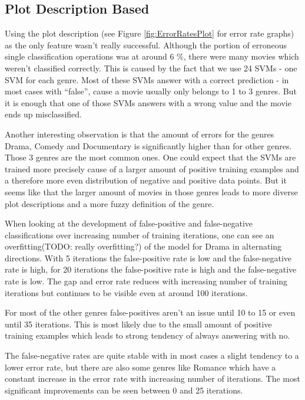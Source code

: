 \documentclass{vldb}
\begin{document}
\subsection{Plot Description Based}
\par Using the plot description (see Figure \ref{fig:ErrorRatesPlot} for error rate graphs) as the only feature wasn’t really successful. Although the portion of erroneous single classification operations was at around 6 \%, there were many movies which weren’t classified correctly. This is caused by the fact that we use 24 SVMs - one SVM for each genre. Most of these SVMs answer with a correct prediction - in most cases with “false”, cause a movie usually only belongs to 1 to 3 genres. But it is enough that one of those SVMs answers with a wrong value and the movie ends up misclassified.
\par Another interesting observation is that the amount of errors for the genres Drama, Comedy and Documentary is significantly higher than for other genres. Those 3 genres are the most common ones. One could expect that the SVMs are trained more precisely cause of a larger amount of positive training examples and a therefore more even distribution of negative and positive data points. But it seems like that the larger amount of movies in those genres leads to more diverse plot descriptions and a more fuzzy definition of the genre.
\par When looking at the development of false-positive and false-negative classifications over increasing number of training iterations, one can see an overfitting(TODO: really overfitting?) of the model for Drama in alternating directions. With 5 iterations the false-positive rate is low and the false-negative rate is high, for 20 iterations the false-positive rate is high and the false-negative rate is low. The gap and error rate reduces with increasing number of training iterations but continues to be visible even at around 100 iterations.
\par For most of the other genres false-positives aren’t an issue until 10 to 15 or even until 35 iterations. This is most likely due to the small amount of positive training examples which leads to strong tendency of always answering with no.
\par The false-negative rates are quite stable with in most cases a slight tendency to a lower error rate, but there are also some genres like Romance which have a constant increase in the error rate with increasing number of iterations. The most significant improvements can be seen between 0 and 25 iterations.
\end{document}

